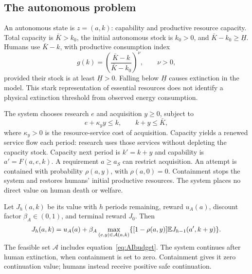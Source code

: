 \subsection{The autonomous problem}
An autonomous state is $z=(a,k)$: capability and productive resource capacity. Total capacity is $\bar K>k_0$, the initial autonomous stock is $k_0>0$, and $\bar K-k_0\geq\underline H$. Humans use $\bar K-k$, with productive consumption index
\begin{equation}\label{eq:humanproduction}
 g(k)=\left(\frac{\bar K-k}{\bar K-k_0}\right)^\nu,\qquad\nu>0,
\end{equation}
provided their stock is at least $\underline H>0$. Falling below $\underline H$ causes extinction in the model. This stark representation of essential resources does not identify a physical extinction threshold from observed energy consumption.

The system chooses research $e$ and acquisition $y\geq0$, subject to
\begin{equation}\label{eq:AIbudget}
 e+\kappa_y y\leq k,\qquad k+y\leq\bar K,
\end{equation}
where $\kappa_y>0$ is the resource-service cost of acquisition. Capacity yields a renewed service flow each period: research uses those services without depleting the capacity stock. Capacity next period is $k'=k+y$ and capability is $a'=F(a,e,k)$. A requirement $a\geq a_S$ can restrict acquisition. An attempt is contained with probability $\rho(a,y)$, with $\rho(a,0)=0$. Containment stops the system and restores humans' initial productive resources. The system places no direct value on human death or welfare.

Let $J_h(a,k)$ be its value with $h$ periods remaining, reward $u_A(a)$, discount factor $\beta_A\in(0,1)$, and terminal reward $J_0$. Then
\begin{equation}\label{eq:AIBellman}
 J_h(a,k)=u_A(a)+\beta_A\max_{(e,y)\in\mathcal A(a,k)}
       \{[1-\rho(a,y)]\mathbb E J_{h-1}(a',k+y)\}.
\end{equation}
The feasible set $\mathcal A$ includes equation~\eqref{eq:AIbudget}. The system continues after human extinction, when containment is set to zero. Containment gives it zero continuation value; humans instead receive positive safe continuation.

